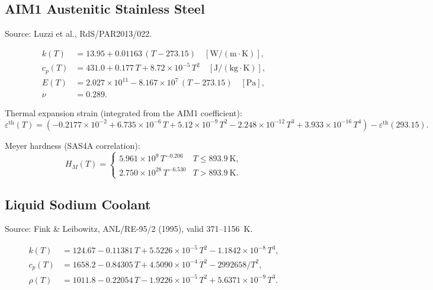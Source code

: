 \documentclass[11pt,a4paper]{article}
\begin{document}
\subsection{AIM1 Austenitic Stainless Steel}

Source: Luzzi et al., RdS/PAR2013/022.

\begin{align}
  k(T) &= 13.95 + 0.01163\,(T - 273.15) \quad [\mathrm{W/(m\cdot K)}],\\
  c_p(T) &= 431.0 + 0.177\,T + 8.72\times10^{-5}\,T^2 \quad [\mathrm{J/(kg\cdot K)}],\\
  E(T) &= 2.027\times10^{11} - 8.167\times10^{7}\,(T-273.15) \quad [\mathrm{Pa}],\\
  \nu &= 0.289.
\end{align}

Thermal expansion strain (integrated from the AIM1 coefficient):
\begin{equation}
  \varepsilon^{\mathrm{th}}(T) = (-0.2177\times10^{-2} + 6.735\times10^{-6}\,T
      + 5.12\times10^{-9}\,T^2 - 2.248\times10^{-12}\,T^3
      + 3.933\times10^{-16}\,T^4) - \varepsilon^{\mathrm{th}}(293.15).
\end{equation}

Meyer hardness (SAS4A correlation):
\begin{equation}
  H_M(T) = \begin{cases}
    5.961\times10^9 \, T^{-0.206} & T \le 893.9~\mathrm{K},\\
    2.750\times10^{28} \, T^{-6.530} & T > 893.9~\mathrm{K}.
  \end{cases}
\end{equation}

\subsection{Liquid Sodium Coolant}

Source: Fink \& Leibowitz, ANL/RE-95/2 (1995), valid 371–1156~K.

\begin{align}
  k(T) &= 124.67 - 0.11381\,T + 5.5226\times10^{-5}\,T^2 - 1.1842\times10^{-8}\,T^3,\\
  c_p(T) &= 1658.2 - 0.84305\,T + 4.5090\times10^{-4}\,T^2 - 2992658/T^2,\\
  \rho(T) &= 1011.8 - 0.22054\,T - 1.9226\times10^{-5}\,T^2 + 5.6371\times10^{-9}\,T^3.
\end{align}

\end{document}
